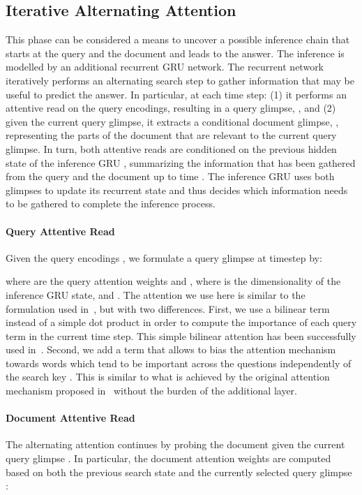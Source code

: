 \documentclass[11pt]{article}
\begin{document}
\subsection{Iterative Alternating Attention}
\label{sec:iterative}
This phase can be considered a means to uncover a possible inference chain that starts at the query and the document and leads to the answer.
The inference is modelled by an additional recurrent GRU network. The recurrent network iteratively performs an alternating search step to gather information that may be useful to predict the answer.
In particular, at each time step: (1) it performs an attentive read on the query encodings, resulting in a query glimpse, , and (2) given the current query glimpse, it extracts a conditional document glimpse, , representing the parts of the document that are relevant to the current query glimpse. In turn, both attentive reads are conditioned on the previous hidden state of the inference GRU , summarizing the information that has been gathered from the query and the document up to time . The inference GRU uses both glimpses to update its recurrent state and thus decides which information needs to be gathered to complete the inference process.

\paragraph{Query Attentive Read} Given the query encodings , we formulate a query glimpse  at timestep  by:


where  are the query attention weights and , where  is the dimensionality of the inference GRU state, and .
The attention we use here is similar to the formulation used in~\cite{hill2015goldilocks,sukhbaatar2015end}, but with two differences. First, we use a bilinear term instead of a simple dot product in order to compute the importance of each query term in the current time step. This simple bilinear attention has been successfully used in~\cite{luong-pham-manning:2015:EMNLP}. Second, we add a term  that allows to bias the attention mechanism towards words which tend to be important across the questions independently of the search key . This is similar to what is achieved by the original attention mechanism proposed in~\cite{bahdanau2014neural} without the burden of the additional  layer.

\paragraph{Document Attentive Read} The alternating attention continues by probing the document given the current query glimpse .
In particular, the document attention weights are computed based on both the previous search state and the currently selected query glimpse :
\end{document}
